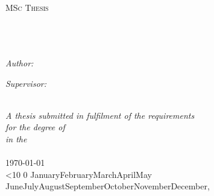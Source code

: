 \documentclass[11pt, a4paper, oneside]{Thesis} %
\begin{document}
\begin{titlepage}
\begin{center}

\textsc{\LARGE \univname}\\[1.5cm] %
\textsc{\Large MSc Thesis}\\[0.5cm] %

\HRule \\[0.4cm] %
{\huge \bfseries \ttitle}\\[0.4cm] %
\HRule \\[1.5cm] %
 
\begin{minipage}{0.4\textwidth}
\begin{flushleft} \large
\emph{Author:}\\
{\authornames} %
\end{flushleft}
\end{minipage}
\begin{minipage}{0.4\textwidth}
\begin{flushright} \large
\emph{Supervisor:} \\
{\supname} %
\end{flushright}
\end{minipage}\\[3cm]
 
\large \textit{A thesis submitted in fulfilment of the requirements\\ for the degree of \degreename}\\[0.3cm] %
\textit{in the}\\[0.4cm]
\deptname\\[2cm] %


{\large \today}\\[4cm] %

\renewcommand{\today}{\ifnum\number\day<10 0\fi \number\day \space%
\ifcase \month \or January\or February\or March\or April\or May%
\or June\or July\or August\or September\or October\or November\or December\fi,%
\number \year} 
\today 

\vfill
\end{center}

\end{titlepage}
\end{document}
